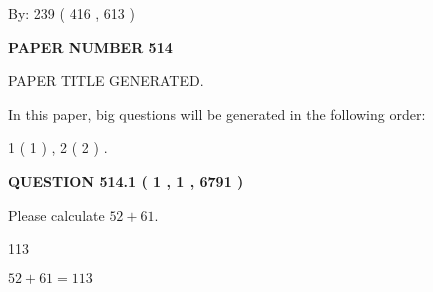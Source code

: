 \documentclass[12pt]{article}
\begin{document}
   
\hspace{1.0in} By: 
 239 ( 416 ,  613 )
   
   
   
   
\newpage 
\setcounter{page}{ 
   514001 } 
   
   
   
   
 {\textbf{ \Large{ PAPER NUMBER  514  }}}
   
   
\vspace{0.2in}
   
   
   
   
   
   
   
   
 \vspace{0.2in}
 
 
 
 
   
   
 PAPER TITLE GENERATED.
   
   
   
\vspace{0.2in}
   
In this paper, big questions will be generated in the following order: 
   
   
   1 ( 1 )
 ,
   2 ( 2 )
 .
  
\vspace{0.2in}
  
{\textbf{\Large{QUESTION
514.1 
 ( 1 , 1 , 6791 )
}}}
  
  
 
Please calculate $ %
52 +  %
61 $.
 
 
 
\noindent{}
 
 

113
 
 
\noindent{}
 
 

 
 
 
\noindent{}
 
 

$ %
52 +  %
61=   %
113$
 
 
\noindent{}
 
\end{document}
